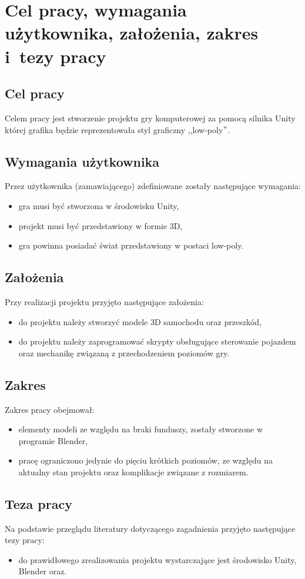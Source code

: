 \chapter{Cel pracy, wymagania użytkownika, założenia, zakres i~tezy pracy}
\section{Cel pracy}\label{cel}
Celem pracy jest stworzenie projektu gry komputerowej za pomocą silnika Unity której grafika będzie reprezentowała styl graficzny ,,low-poly$"$.

\section{Wymagania użytkownika}
Przez użytkownika (zamawiającego) zdefiniowane zostały następujące wymagania:
\begin{itemize}
\item gra musi być stworzona w środowisku Unity,
\item projekt musi być przedstawiony w formie 3D,
\item gra powinna posiadać świat przedstawiony w postaci low-poly.
\end{itemize}
\section{Założenia}
Przy realizacji projektu przyjęto następujące założenia:
\begin{itemize}
\item do projektu należy stworzyć modele 3D samochodu oraz przeszkód,
\item do projektu należy zaprogramować skrypty obsługujące sterowanie pojazdem oraz mechanikę związaną z przechodzeniem poziomów gry.
\end{itemize}
\section{Zakres}
Zakres pracy obejmował:
\begin{itemize}
\item elementy modeli ze względu na braki funduszy, zostały stworzone w programie Blender,
\item pracę ograniczono jedynie do pięciu krótkich poziomów, ze względu na aktualny stan projektu oraz komplikacje związane z rozmiarem.
\end{itemize}
\section{Teza pracy}
Na podstawie przeglądu literatury dotyczącego zagadnienia przyjęto następujące tezy pracy:
\begin{itemize}
  \item do prawidłowego zrealizowania projektu wystarczające jest środowisko Unity, Blender oraz.
\end{itemize}
